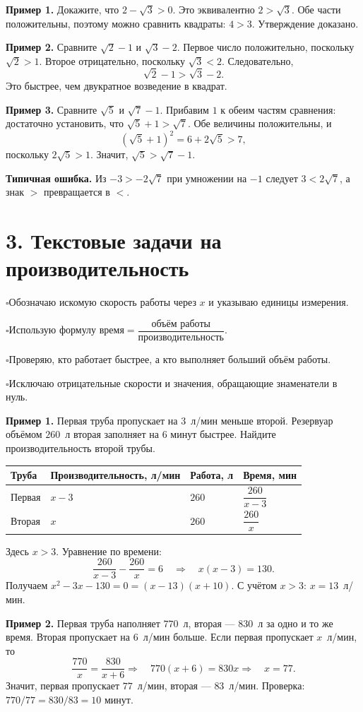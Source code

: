 \documentclass[a4paper,11pt]{article}
\newcommand{\secname}[1]{\section*{\textcolor{darkaccent}{#1}}}
\newcommand{\checkline}[1]{\par\noindent\textcolor{accent}{\(\square\)}\hspace{0.5em}#1\par}
\begin{document}
\textbf{Пример 1.} Докажите, что \(2-\sqrt3>0\). Это эквивалентно \(2>\sqrt3\). Обе части положительны, поэтому можно сравнить квадраты: \(4>3\). Утверждение доказано.

\textbf{Пример 2.} Сравните \(\sqrt2-1\) и \(\sqrt3-2\). Первое число положительно, поскольку \(\sqrt2>1\). Второе отрицательно, поскольку \(\sqrt3<2\). Следовательно,
\[
\boxed{\sqrt2-1>\sqrt3-2.}
\]
Это быстрее, чем двукратное возведение в квадрат.

\textbf{Пример 3.} Сравните \(\sqrt5\) и \(\sqrt7-1\). Прибавим \(1\) к обеим частям сравнения: достаточно установить, что \(\sqrt5+1>\sqrt7\). Обе величины положительны, и
\[
(\sqrt5+1)^2=6+2\sqrt5>7,
\]
поскольку \(2\sqrt5>1\). Значит, \(\sqrt5>\sqrt7-1\).

\textcolor{burgundy}{\textbf{Типичная ошибка.}} Из \(-3>-2\sqrt7\) при умножении на \(-1\) следует \(3<2\sqrt7\), а знак \(>\) превращается в \(<\).

\clearpage
\secname{3. Текстовые задачи на производительность}
\checkline{Обозначаю искомую скорость работы через \(x\) и указываю единицы измерения.}
\checkline{Использую формулу \(\text{время}=\dfrac{\text{объём работы}}{\text{производительность}}\).}
\checkline{Проверяю, кто работает быстрее, а кто выполняет больший объём работы.}
\checkline{Исключаю отрицательные скорости и значения, обращающие знаменатели в нуль.}

\textbf{Пример 1.} Первая труба пропускает на \(3\)~л/мин меньше второй. Резервуар объёмом \(260\)~л вторая заполняет на \(6\) минут быстрее. Найдите производительность второй трубы.
\begin{center}
\renewcommand{\arraystretch}{1.22}
\begin{tabularx}{\linewidth}{@{}l>{\centering\arraybackslash}X>{\centering\arraybackslash}X>{\centering\arraybackslash}X@{}}
\toprule
Труба & Производительность, л/мин & Работа, л & Время, мин\\\midrule
Первая & \(x-3\) & \(260\) & \(\dfrac{260}{x-3}\)\\
Вторая & \(x\) & \(260\) & \(\dfrac{260}{x}\)\\\bottomrule
\end{tabularx}
\end{center}
Здесь \(x>3\). Уравнение по времени:
\[
\frac{260}{x-3}-\frac{260}{x}=6
\quad\Longrightarrow\quad
x(x-3)=130.
\]
Получаем \(x^2-3x-130=0=(x-13)(x+10)\). С учётом \(x>3\): \(x=13\)~л/мин.

\textbf{Пример 2.} Первая труба наполняет \(770\)~л, вторая --- \(830\)~л за одно и то же время. Вторая пропускает на \(6\)~л/мин больше. Если первая пропускает \(x\)~л/мин, то
\[
\frac{770}{x}=\frac{830}{x+6}
\Longrightarrow\quad 770(x+6)=830x
\Longrightarrow\quad x=77.
\]
Значит, первая пропускает \(77\)~л/мин, вторая --- \(83\)~л/мин. Проверка: \(770/77=830/83=10\) минут.
\end{document}
